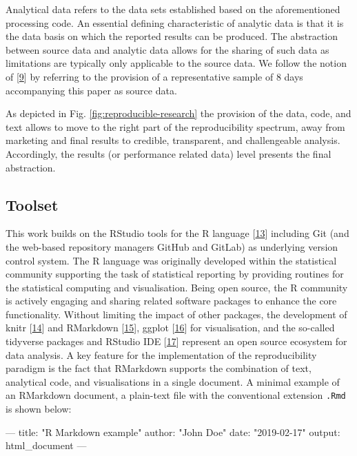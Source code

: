 \documentclass[conference,final,a4paper,]{IEEEtran}
\newenvironment{Shaded}{\begin{snugshade}}{\end{snugshade}}
\newcommand{\AttributeTok}[1]{\textcolor[rgb]{0.77,0.63,0.00}{#1}}
\newcommand{\FunctionTok}[1]{\textcolor[rgb]{0.00,0.00,0.00}{#1}}
\newcommand{\OtherTok}[1]{\textcolor[rgb]{0.56,0.35,0.01}{#1}}
\newcommand{\StringTok}[1]{\textcolor[rgb]{0.31,0.60,0.02}{#1}}
\begin{document}
Analytical data refers to the data sets established based on the aforementioned processing code.
An essential defining characteristic of analytic data is that it is the data basis on which the reported results can be produced.
The abstraction between source data and analytic data allows for the sharing of such data as limitations are typically only applicable to the source data. We follow the notion of {[}\protect\hyperlink{ref-marwick_2017}{9}{]} by referring to the provision of a representative sample of 8 days accompanying this paper as source data.

As depicted in Fig. \ref{fig:reproducible-research} the provision of the data, code, and text allows to move to the right part of the reproducibility spectrum, away from marketing and final results to credible, transparent, and challengeable analysis.
Accordingly, the results (or performance related data) level presents the final abstraction.

\hypertarget{toolset}{%
\subsection{Toolset}\label{toolset}}

This work builds on the RStudio tools for the R language {[}\protect\hyperlink{ref-rcoreteam_2018}{13}{]} including Git (and the web-based repository managers GitHub and GitLab) as underlying version control system.
The R language was originally developed within the statistical community supporting the task of statistical reporting by providing routines for the statistical computing and visualisation.
Being open source, the R community is actively engaging and sharing related software packages to enhance the core functionality.
Without limiting the impact of other packages, the development of knitr {[}\protect\hyperlink{ref-R-knitr}{14}{]} and RMarkdown {[}\protect\hyperlink{ref-xie2018}{15}{]}, ggplot {[}\protect\hyperlink{ref-wickham_2016}{16}{]} for visualisation, and the so-called tidyverse packages and RStudio IDE {[}\protect\hyperlink{ref-rstudioteam_2015}{17}{]} represent an open source ecosystem for data analysis.
A key feature for the implementation of the reproducibility paradigm is the fact that RMarkdown supports the combination of text, analytical code, and visualisations in a single document.
A minimal example of an RMarkdown document, a plain-text file with the conventional
extension \texttt{.Rmd} is shown below:

\footnotesize

\begin{Shaded}
\begin{Highlighting}[]
\OtherTok{---}
\FunctionTok{title:}\AttributeTok{ }\StringTok{"R Markdown example"}
\FunctionTok{author:}\AttributeTok{ }\StringTok{"John Doe"}
\FunctionTok{date:}\AttributeTok{ }\StringTok{"2019-02-17"}
\FunctionTok{output:}\AttributeTok{ html_document}
\OtherTok{---}
\end{Highlighting}
\end{Shaded}
\end{document}
